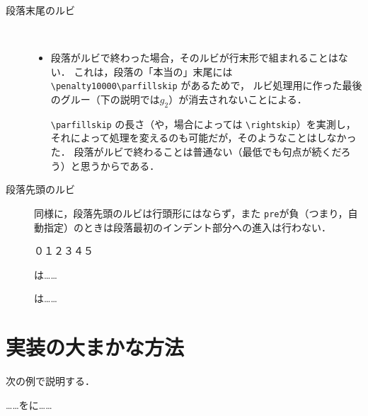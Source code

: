 \documentclass[a4paper,10pt]{ltjsarticle}
\begin{document}
\begin{description}
\newpage
\item[段落末尾のルビ]\ 
\begin{itemize}
\item 段落がルビで終わった場合，そのルビが行末形で組まれることはない．
これは，段落の「本当の」末尾には \verb+\penalty10000\parfillskip+ があるためで，
ルビ処理用に作った最後のグルー（下の説明では$g_2$）が消去されないことによる．

\verb+\parfillskip+ の長さ（や，場合によっては \verb+\rightskip+）を実測し，
それによって処理を変えるのも可能だが，そのようなことはしなかった．
段落がルビで終わることは普通ない（最低でも句点が続くだろう）と思うからである．
\end{itemize} 

\item[段落先頭のルビ]
同様に，段落先頭のルビは行頭形にはならず，また
\texttt{pre}が負（つまり，自動指定）のときは段落最初のインデント部分への進入は行わない．
\begin{LTXexample}
\zw\noindent ０１２３４５\par
{}は……\par
{}は……
\end{LTXexample}


\end{description}

\section{実装の大まかな方法}
次の例で説明する．
\begin{LTXexample}
……をに……
\end{LTXexample}
\end{document}
